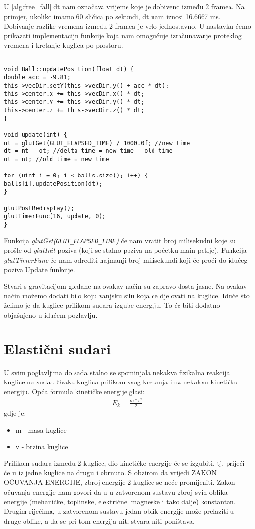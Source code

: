 U \ref{alg:free_fall} dt nam označava vrijeme koje je dobiveno između 2 framea. Na primjer, ukoliko imamo 60 sličica po sekundi, dt nam iznosi 16.6667 ms. Dobivanje razlike vremena između 2 framea je vrlo jednostavno. U nastavku ćemo prikazati implementaciju funkcije koja nam omogućuje izračunavanje proteklog vremena i kretanje kuglica po prostoru. \newpage
\begin{lstlisting}[style = myC++, label = {code:12}, caption = {Implementacije update funkcija}]

void Ball::updatePosition(float dt) {
double acc = -9.81;
this->vecDir.setY(this->vecDir.y() + acc * dt);
this->center.x += this->vecDir.x() * dt;
this->center.y += this->vecDir.y() * dt;
this->center.z += this->vecDir.z() * dt;
}

void update(int) {
nt = glutGet(GLUT_ELAPSED_TIME) / 1000.0f; //new time
dt = nt - ot; //delta time = new time - old time
ot = nt; //old time = new time

for (uint i = 0; i < balls.size(); i++) {
balls[i].updatePosition(dt);
}

glutPostRedisplay();
glutTimerFunc(16, update, 0);
}
\end{lstlisting}

Funkcija \emph{glutGet(\texttt{GLUT\_ELAPSED\_TIME})} će nam vratit broj milisekudni koje su prošle od \emph{glutInit} poziva (koji se stalno poziva na početku main petlje). Funkcija \emph{glutTimerFunc} će nam odrediti najmanji broj milisekundi koji će proći do idućeg poziva Update funkcije.

Stvari s gravitacijom gledane na ovakav način su zapravo dosta jasne. Na ovakav način možemo dodati bilo koju vanjsku silu koja će djelovati na kuglice. Iduće što želimo je da kuglice prilikom sudara izgube energiju. To će biti dodatno objašnjeno u idućem poglavlju.\newpage
\section{Elastični sudari}
U svim poglavljima do sada stalno se spominjala nekakva fizikalna reakcija kuglice na sudar. Svaka kuglica prilikom svog kretanja ima nekakvu kinetičku energiju. Opća formula kinetičke energije glasi:
\begin{equation}\label{equ:kinetic}
	\begin{aligned}
	E_{k} = \frac{m * v^2}{2}
	\end{aligned}
\end{equation}
gdje je:
\begin{itemize}
	\item m - masa kuglice 
	\item v - brzina kuglice
\end{itemize}
Prilikom sudara između 2 kuglice, dio kinetičke energije će se izgubiti, tj. prijeći će u iz jedne kuglice na drugu i obrnuto. S obzirom da vrijedi ZAKON OČUVANJA ENERGIJE, zbroj energije 2 kuglice se neće promijeniti. Zakon očuvanja energije nam govori da u u zatvorenom sustavu zbroj svih oblika energije (mehaničke, toplinske, električne, magneske i tako dalje) konstantan. Drugim riječima, u zatvorenom sustavu jedan oblik energije može prelaziti u druge oblike, a da se pri tom energija niti stvara niti poništava\cite{11}.

